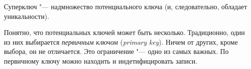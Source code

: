 \begin{Def}
	Суперключ "--- надмножество потенциального ключа (и, следовательно, обладает уникальности).
\end{Def}

Понятно, что потенциальных ключей может быть несколько.
Традиционно, один из них выбирается \textit{первичным ключом} (\textit{primary key}).
Ничем от других, кроме выбора, он не отличается.
Это ограничение "--- одно из самых важных.
По первичному ключу можно находить и индетифицировать записи.
